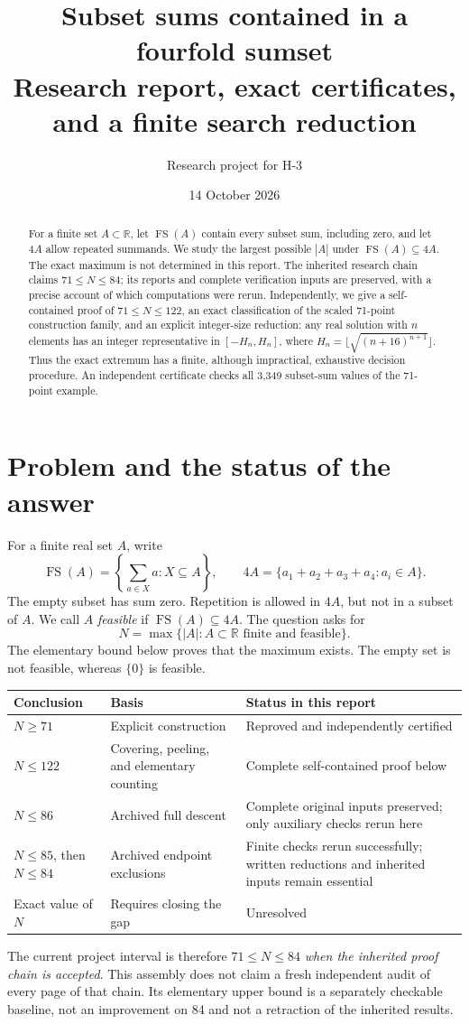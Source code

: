 \documentclass[11pt,a4paper]{article}
\title{Subset sums contained in a fourfold sumset\\\large Research report, exact certificates, and a finite search reduction}
\author{Research project for H-3}
\date{14 October 2026}
\theoremstyle{remark}\newtheorem{remark}[theorem]{Remark}
\newcommand{\FS}{\operatorname{FS}}
\newcommand{\R}{\mathbb R}\newcommand{\Z}{\mathbb Z}
\begin{document}
\maketitle
\begin{abstract}
For a finite set $A\subset\R$, let $\FS(A)$ contain every subset sum, including zero, and let $4A$ allow repeated summands. We study the largest possible $|A|$ under $\FS(A)\subseteq4A$. The exact maximum is not determined in this report. The inherited research chain claims $71\le N\le84$; its reports and complete verification inputs are preserved, with a precise account of which computations were rerun. Independently, we give a self-contained proof of $71\le N\le122$, an exact classification of the scaled 71-point construction family, and an explicit integer-size reduction: any real solution with $n$ elements has an integer representative in $[-H_n,H_n]$, where $H_n=\lfloor\sqrt{(n+16)^{n+1}}\rfloor$. Thus the exact extremum has a finite, although impractical, exhaustive decision procedure. An independent certificate checks all 3,349 subset-sum values of the 71-point example.
\end{abstract}
\tableofcontents
\newpage

\section{Problem and the status of the answer}
For a finite real set $A$, write
\[
 \FS(A)=\left\{\sum_{a\in X}a:X\subseteq A\right\},\qquad
 4A=\{a_1+a_2+a_3+a_4:a_i\in A\}.
\]
The empty subset has sum zero. Repetition is allowed in $4A$, but not in a subset of $A$. We call $A$ \emph{feasible} if $\FS(A)\subseteq4A$. The question asks for
\[N=\max\{|A|: A\subset\R\text{ finite and feasible}\}.\]
The elementary bound below proves that the maximum exists. The empty set is not feasible, whereas $\{0\}$ is feasible.

\begin{center}
\begin{tabular}{p{.25\linewidth}p{.29\linewidth}p{.35\linewidth}}
\toprule
Conclusion & Basis & Status in this report\\\midrule
$N\ge71$ & Explicit construction & Reproved and independently certified\\
$N\le122$ & Covering, peeling, and elementary counting & Complete self-contained proof below\\
$N\le86$ & Archived full descent & Complete original inputs preserved; only auxiliary checks rerun here\\
$N\le85$, then $N\le84$ & Archived endpoint exclusions & Finite checks rerun successfully; written reductions and inherited inputs remain essential\\
Exact value of $N$ & Requires closing the gap & Unresolved\\\bottomrule
\end{tabular}
\end{center}
The current project interval is therefore $71\le N\le84$ \emph{when the inherited proof chain is accepted}. This assembly does not claim a fresh independent audit of every page of that chain. Its elementary upper bound is a separately checkable baseline, not an improvement on 84 and not a retraction of the inherited results.
\end{document}
